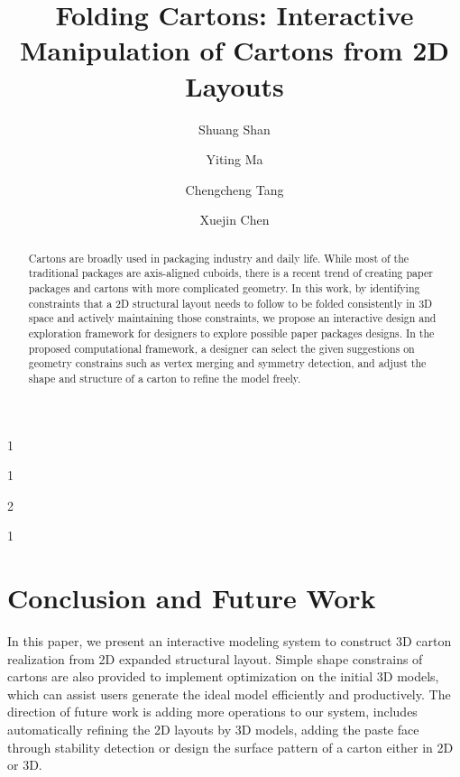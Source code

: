 \documentclass[submission]{gmp2018}
\begin{document}
%
%
\title{Folding Cartons: Interactive Manipulation of Cartons from 2D Layouts}

%
%
\SubNumber{{\color{red}{XXX}}}

%
%
\author{Shuang Shan}{1}
\author{Yiting Ma}{1}
\author{Chengcheng Tang}{2}
\author{Xuejin Chen}{1}

%
%

%
%


\maketitle

\begin{abstract}
Cartons are broadly used in packaging industry and daily life. While most of the traditional packages are axis-aligned cuboids, there is a recent trend of creating paper packages and cartons with more complicated geometry. In this work, by identifying constraints that a 2D structural layout needs to follow to be folded consistently in 3D space and actively maintaining those constraints, we propose an interactive design and exploration framework for designers to explore possible paper packages designs. In the proposed computational framework, a designer can select the given suggestions on geometry constrains such as vertex merging and symmetry detection, and adjust the shape and structure of a carton to refine the model freely.
\end{abstract}









\section{Conclusion and Future Work}\label{sec:conclusion}
In this paper, we present an interactive modeling system to construct 3D carton realization from 2D expanded structural layout. Simple shape constrains of cartons are also provided to implement optimization on the initial 3D models, which can assist users generate the ideal model efficiently and productively. The direction of future work is adding more operations to our system, includes automatically refining the 2D layouts by 3D models, adding the paste face through stability detection or design the surface pattern of a carton either in 2D or 3D. 




\end{document}
